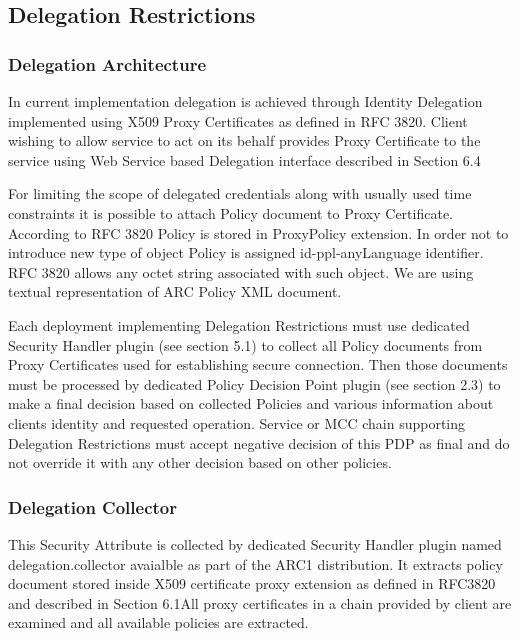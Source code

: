 \documentclass{article}
\begin{document}
\subsection[Delegation Restrictions]{Delegation Restrictions}
\label{bkm:Ref204009393}\subsubsection[Delegation
Architecture]{Delegation Architecture}
\label{bkm:Ref204009914}{\upshape\color{black}
In current implementation delegation is achieved through Identity
Delegation implemented using X509 Proxy Certificates as defined in RFC
3820. Client wishing to allow service to act on it{\textquotesingle}s
behalf provides Proxy Certificate to the service using Web Service
based Delegation interface described in Section 6.4}

{\upshape\color{black}
For limiting the scope of delegated credentials along with usually used
time constraints it is possible to attach Policy document to Proxy
Certificate. According to RFC 3820 Policy is stored in ProxyPolicy
extension. In order not to introduce new type of object Policy is
assigned id-ppl-anyLanguage identifier. RFC 3820 allows any octet
string associated with such object. We are using textual representation
of ARC Policy XML document.}

{\upshape\color{black}
Each deployment implementing Delegation Restrictions must use dedicated
Security Handler plugin (see section 5.1) to collect all Policy
documents from Proxy Certificates used for establishing secure
connection. Then those documents must be processed by dedicated Policy
Decision Point plugin (see section 2.3) to make a final decision based
on collected Policies and various information about
client{\textquotesingle}s identity and requested operation. Service or
MCC chain supporting Delegation Restrictions must accept negative
decision of this PDP as final and do not override it with any other
decision based on other policies.}

\subsubsection[Delegation Collector]{Delegation Collector}
\label{bkm:Ref204009734}{\upshape\color{black}
This Security Attribute is collected by dedicated Security Handler
plugin named {\textquotedbl}delegation.collector{\textquotedbl}
avaialble as part of the ARC1 distribution. It extracts policy document
stored inside X509 certificate proxy extension as defined in RFC3820
and described in Section 6.1All proxy certificates in a chain provided
by client are examined and all available policies are extracted. }
\end{document}
